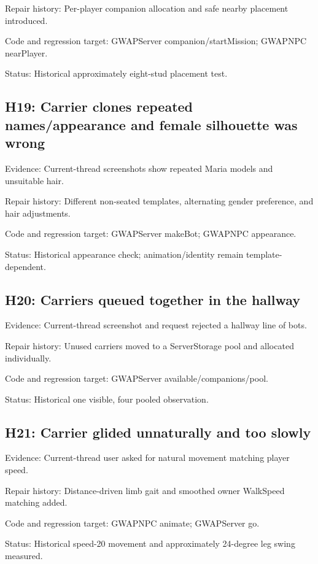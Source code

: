 Repair history: Per-player companion allocation and safe nearby placement introduced.\allowbreak{}

Code and regression target: GWAPServer companion/\allowbreak{}startMission; GWAPNPC nearPlayer.\allowbreak{}

Status: Historical approximately eight-stud placement test.\allowbreak{}

\subsection{H19: Carrier clones repeated names/\allowbreak{}appearance and female silhouette was wrong}
Evidence: Current-thread screenshots show repeated Maria models and unsuitable hair.\allowbreak{}

Repair history: Different non-seated templates, alternating gender preference, and hair adjustments.\allowbreak{}

Code and regression target: GWAPServer makeBot; GWAPNPC appearance.\allowbreak{}

Status: Historical appearance check; animation/\allowbreak{}identity remain template-dependent.\allowbreak{}

\subsection{H20: Carriers queued together in the hallway}
Evidence: Current-thread screenshot and request rejected a hallway line of bots.\allowbreak{}

Repair history: Unused carriers moved to a ServerStorage pool and allocated individually.\allowbreak{}

Code and regression target: GWAPServer available/\allowbreak{}companions/\allowbreak{}pool.\allowbreak{}

Status: Historical one visible, four pooled observation.\allowbreak{}

\subsection{H21: Carrier glided unnaturally and too slowly}
Evidence: Current-thread user asked for natural movement matching player speed.\allowbreak{}

Repair history: Distance-driven limb gait and smoothed owner WalkSpeed matching added.\allowbreak{}

Code and regression target: GWAPNPC animate; GWAPServer go.\allowbreak{}

Status: Historical speed-20 movement and approximately 24-degree leg swing measured.\allowbreak{}

